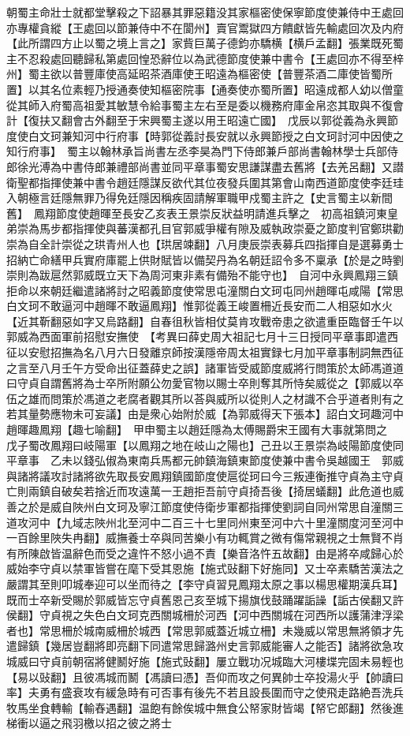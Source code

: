 朝蜀主命壯士就都堂擊殺之下詔暴其罪惡籍没其家樞密使保寧節度使兼侍中王處回亦專權貪縱【王處回以節兼侍中不在閬州】賣官鬻獄四方饋獻皆先輸處回次及内府【此所謂四方止以蜀之境上言之】家貲巨萬子德鈞亦驕横【横戶孟翻】張業既死蜀主不忍殺處回聽歸私第處回惶恐辭位以為武德節度使兼中書令【王處回亦不得至梓州】蜀主欲以普豐庫使高延昭茶酒庫使王昭遠為樞密使【普豐茶酒二庫使皆蜀所置】以其名位素輕乃授通奏使知樞密院事【通奏使亦蜀所置】昭遠成都人幼以僧童從其師入府蜀高祖愛其敏慧令給事蜀主左右至是委以機務府庫金帛恣其取與不復會計【復扶又翻會古外翻至于宋興蜀主遂以用王昭遠亡國】　戊辰以郭從義為永興節度使白文珂兼知河中行府事【時郭從義討長安就以永興節授之白文珂討河中因使之知行府事】　蜀主以翰林承旨尚書左丞李昊為門下侍郎兼戶部尚書翰林學士兵部侍郎徐光溥為中書侍郎兼禮部尚書並同平章事蜀安思謙謀盡去舊將【去羌呂翻】又譛衛聖都指揮使兼中書令趙廷隱謀反欲代其位夜發兵圍其第會山南西道節度使李廷珪入朝極言廷隱無罪乃得免廷隱因稱疾固請解軍職甲戍蜀主許之【史言蜀主以新間舊】　鳳翔節度使趙暉至長安乙亥表王景崇反狀益明請進兵擊之　初高祖鎮河東皇弟崇為馬步都指揮使與蕃漢都孔目官郭威爭權有隙及威執政崇憂之節度判官鄭珙勸崇為自全計崇從之珙青州人也【珙居竦翻】八月庚辰崇表募兵四指揮自是選募勇士招納亡命繕甲兵實府庫罷上供財賦皆以備契丹為名朝廷詔令多不稟承【於是之時劉崇則為跋扈然郭威既立天下為周河東非素有備殆不能守也】　自河中永興鳳翔三鎮拒命以來朝廷繼遣諸將討之昭義節度使常思屯潼關白文珂屯同州趙暉屯咸陽【常思白文珂不敢逼河中趙暉不敢逼鳳翔】惟郭從義王峻置柵近長安而二人相惡如水火【近其靳翻惡如字又烏路翻】自春徂秋皆相仗莫肯攻戰帝患之欲遣重臣臨督壬午以郭威為西面軍前招慰安撫使　【考異曰薛史周大祖記七月十三日授同平章事即遣西征以安慰招撫為名八月六日發離京師按漢隱帝周太祖實録七月加平章事制詞無西征之言至八月壬午方受命出征蓋薛史之誤】諸軍皆受威節度威將行問策於太師馮道道曰守貞自謂舊將為士卒所附願公勿愛官物以賜士卒則奪其所恃矣威從之【郭威以卒伍之雄而問策於馮道之老腐者觀其所以荅與威所以從則人之材識不合乎道者則有之若其量勢應物未可妄議】由是衆心始附於威【為郭威得天下張本】詔白文珂趣河中趙暉趣鳳翔【趣七喻翻】　甲申蜀主以趙廷隱為太傅賜爵宋王國有大事就第問之　戊子蜀改鳳翔曰岐陽軍【以鳳翔之地在岐山之陽也】己丑以王景崇為岐陽節度使同平章事　乙未以錢弘俶為東南兵馬都元帥鎮海鎮東節度使兼中書令吳越國王　郭威與諸將議攻討諸將欲先取長安鳳翔鎮國節度使扈從珂曰今三叛連衡推守貞為主守貞亡則兩鎮自破矣若捨近而攻遠萬一王趙拒吾前守貞掎吾後【掎居蟻翻】此危道也威善之於是威自陜州白文珂及寧江節度使侍衛步軍都指揮使劉詞自同州常思自潼關三道攻河中【九域志陜州北至河中二百三十七里同州東至河中六十里潼關度河至河中一百餘里陜失冉翻】威撫養士卒與同苦樂小有功輒賞之微有傷常親視之士無賢不肖有所陳啟皆温辭色而受之違忤不怒小過不責【樂音洛忤五故翻】由是將卒咸歸心於威始李守貞以禁軍皆嘗在麾下受其恩施【施式䜴翻下好施同】又士卒素驕苦漢法之嚴謂其至則叩城奉迎可以坐而待之【李守貞習見鳳翔太原之事以楊思權期漢兵耳】既而士卒新受賜於郭威皆忘守貞舊恩己亥至城下揚旗伐鼓踊躍詬譟【詬古侯翻又許侯翻】守貞視之失色白文珂克西關城柵於河西【河中西關城在河西所以護蒲津浮梁者也】常思柵於城南威柵於城西【常思郭威蓋近城立柵】未幾威以常思無將領才先遣歸鎮【幾居豈翻將即亮翻下同遣常思歸潞州史言郭威能審人之能否】諸將欲急攻城威曰守貞前朝宿將健鬭好施【施式䜴翻】屢立戰功况城臨大河樓堞完固未易輕也【易以䜴翻】且彼馮城而鬭【馮讀曰憑】吾仰而攻之何異帥士卒投湯火乎【帥讀曰率】夫勇有盛衰攻有緩急時有可否事有後先不若且設長圍而守之使飛走路絶吾洗兵牧馬坐食轉輸【輸舂遇翻】温飽有餘俟城中無食公帑家財皆竭【帑它郎翻】然後進梯衝以逼之飛羽檄以招之彼之將士